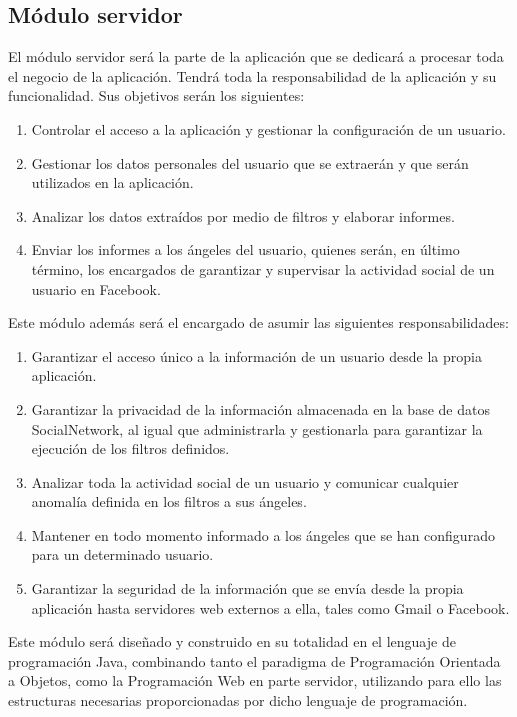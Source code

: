 \subsection{Módulo servidor}
El módulo servidor será la parte de la aplicación que se dedicará a procesar toda el negocio de la aplicación. Tendrá toda la responsabilidad de la aplicación y su funcionalidad. Sus objetivos serán los siguientes:
\begin{enumerate}
\item Controlar el acceso a la aplicación y gestionar la configuración de un usuario.
\item Gestionar los datos personales del usuario que se extraerán y que serán utilizados en la aplicación.
\item Analizar los datos extraídos por medio de filtros y elaborar informes.
\item Enviar los informes a los ángeles del usuario, quienes serán, en último término, los encargados de garantizar y supervisar la actividad social de un usuario en Facebook.
\end{enumerate}
\bigskip
\par
Este módulo además será el encargado de asumir las siguientes responsabilidades:
\begin{enumerate}
\item Garantizar el acceso único a la información de un usuario desde la propia aplicación.
\item Garantizar la privacidad de la información almacenada en la base de datos SocialNetwork, al igual que administrarla y gestionarla para garantizar la ejecución de los filtros definidos.
\item Analizar toda la actividad social de un usuario y comunicar cualquier anomalía definida en los filtros a sus ángeles.
\item Mantener en todo momento informado a los ángeles que se han configurado para un determinado usuario.
\item Garantizar la seguridad de la información que se envía desde la propia aplicación hasta servidores web externos a ella, tales como Gmail o Facebook.
\end{enumerate}
\bigskip
\par
Este módulo será diseñado y construido en su totalidad en el lenguaje de programación Java, combinando tanto el paradigma de Programación Orientada a Objetos, como la Programación Web en parte servidor, utilizando para ello las estructuras necesarias proporcionadas por dicho lenguaje de programación.
